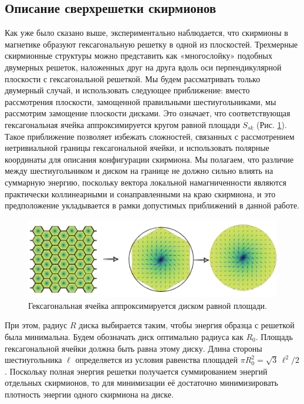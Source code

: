 \documentclass[a4paper,article,14pt]{extarticle}
\begin{document}
\subsection{Описание сверхрешетки скирмионов}
Как уже было сказано выше, экспериментально наблюдается, что скирмионы в магнетике образуют гексагональную решетку в одной из плоскостей. \cite{mulhbauer, yu} Трехмерные скирмионные структуры можно представить как «многослойку» подобных двумерных решеток, наложенных друг на друга вдоль оси перпендикулярной плоскости с гексагональной решеткой. Мы будем рассматривать только двумерный случай, и использовать следующее приближение: вместо рассмотрения плоскости, замощенной правильными шестиугольниками, мы рассмотрим замощение плоскости дисками. Это означает, что соответствующая гексагональная ячейка аппроксимируется кругом равной площади $S_{sk}$ (Рис. \ref{pic:approxHexagone}). Такое приближение позволяет избежать сложностей, связанных с рассмотрением нетривиальной границы гексагональной ячейки, и использовать полярные координаты для описания конфигурации скирмиона. Мы полагаем, что различие между шестиугольником и диском на границе не должно сильно влиять на суммарную энергию, поскольку вектора локальной намагниченности являются практически коллинеарными и сонаправленными на краю скирмиона, и это предположение укладывается в рамки допустимых приближений в данной работе.

\begin{figure}[h]
\centering
\includegraphics[width=0.5\paperwidth]{images/approx.png}
\caption{Гексагональная ячейка аппроксимируется диском равной площади.}
\label{pic:approxHexagone}
\end{figure}

При этом, радиус $R$ диска выбирается таким, чтобы энергия образца с решеткой была минимальна. \cite{bogdanov, nagaosaHan} Будем обозначать диск оптимально радиуса как $R_0$. Площадь гексагональной ячейки должна быть равна этому диску. Длина стороны шестиугольника $\ell$ определяется из условия равенства площадей $\pi R_0^{2} = \sqrt{3}\,\ell^{2}/2$. Поскольку полная энергия решетки получается суммированием энергий отдельных скирмионов, то для минимизации её достаточно минимизировать плотность энергии одного скирмиона на диске.
\end{document}
